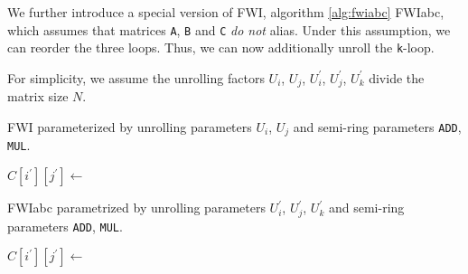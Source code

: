 We further introduce a special version of FWI, algorithm \ref{alg:fwiabc} FWIabc, which assumes that
matrices \texttt{A}, \texttt{B} and \texttt{C} \emph{do not} alias. Under this assumption,
we can reorder the three loops. Thus, we can now additionally unroll the \texttt{k}-loop.

For simplicity, we assume the unrolling factors $U_i$, $U_j$, $U_i^\prime$, $U_j^\prime$,
$U_k^\prime$ divide the matrix size $N$.

\begin{algorithm}
  \caption{FWI parameterized by unrolling parameters $U_i$, $U_j$ and semi-ring parameters \texttt{ADD}, \texttt{MUL}.}\label{alg:fwi}
  \begin{algorithmic}[1]
      \EndFor
      \EndFor
        \Statex{}
        \EndFor
          \State $C[i^\prime][j^\prime] \gets$ 
        \EndFor
      \EndFor
    \EndFunction
  \end{algorithmic}
\end{algorithm}

\begin{algorithm}
  \caption{FWIabc parametrized by unrolling parameters $U_i^\prime$, $U_j^\prime$, $U_k^\prime$ and semi-ring parameters \texttt{ADD}, \texttt{MUL}.}\label{alg:fwiabc}
  \begin{algorithmic}[1]
      \EndFor
      \EndFor
        \Statex{}
        \EndFor
        \EndFor
          \State $C[i^\prime][j^\prime] \gets$ 
        \EndFor
      \EndFor
    \EndFunction
  \end{algorithmic}
\end{algorithm}

